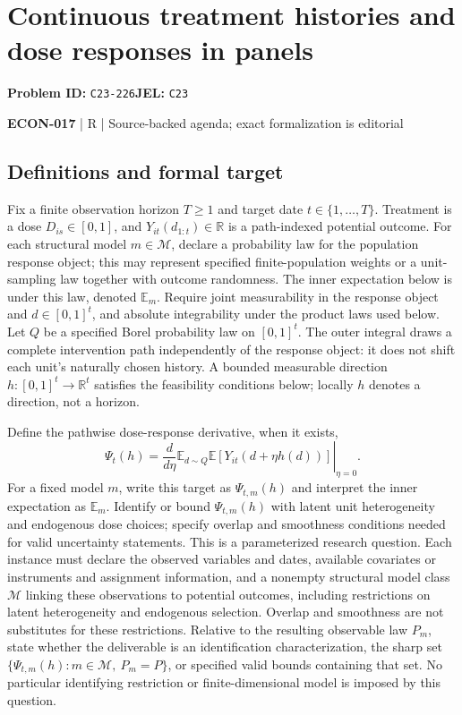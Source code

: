 \documentclass[11pt,a4paper]{article}
\newcommand{\R}{\mathbb R}
\begin{document}
\section*{Continuous treatment histories and dose responses in panels}
\textbf{Problem ID:} \texttt{C23-226}\quad \textbf{JEL:} \texttt{C23}\par
\label{problem:OP-0602}


\label{audited:ECON-017}

{\sffamily\small\color{muted}\textbf{ECON-017} | R | Source-backed agenda; exact formalization is editorial\par}

\subsection*{Definitions and formal target}

Fix a finite observation horizon $T\geq1$ and target date $t\in\{1,\ldots,T\}$. Treatment is a dose $D_{is}\in[0,1]$, and $Y_{it}(d_{1:t})\in\R$ is a path-indexed potential outcome. For each structural model $m\in\mathcal M$, declare a probability law for the population response object; this may represent specified finite-population weights or a unit-sampling law together with outcome randomness. The inner expectation below is under this law, denoted $\mathbb E_m$. Require joint measurability in the response object and $d\in[0,1]^t$, and absolute integrability under the product laws used below. Let $Q$ be a specified Borel probability law on $[0,1]^t$. The outer integral draws a complete intervention path independently of the response object: it does not shift each unit's naturally chosen history. A bounded measurable direction $h:[0,1]^t\to\R^t$ satisfies the feasibility conditions below; locally $h$ denotes a direction, not a horizon.

Define the pathwise dose-response derivative, when it exists,
\[
 \Psi_t(h)=\left.\frac{d}{d\eta}\mathbb E_{d\sim Q}\mathbb E[Y_{it}(d+\eta h(d))]\right|_{\eta=0}.
\]
For a fixed model $m$, write this target as $\Psi_{t,m}(h)$ and interpret the inner expectation as $\mathbb E_m$. Identify or bound $\Psi_{t,m}(h)$ with latent unit heterogeneity and endogenous dose choices; specify overlap and smoothness conditions needed for valid uncertainty statements. This is a parameterized research question. Each instance must declare the observed variables and dates, available covariates or instruments and assignment information, and a nonempty structural model class $\mathcal M$ linking these observations to potential outcomes, including restrictions on latent heterogeneity and endogenous selection. Overlap and smoothness are not substitutes for these restrictions. Relative to the resulting observable law $P_m$, state whether the deliverable is an identification characterization, the sharp set $\{\Psi_{t,m}(h):m\in\mathcal M,\ P_m=P\}$, or specified valid bounds containing that set. No particular identifying restriction or finite-dimensional model is imposed by this question.
\end{document}
